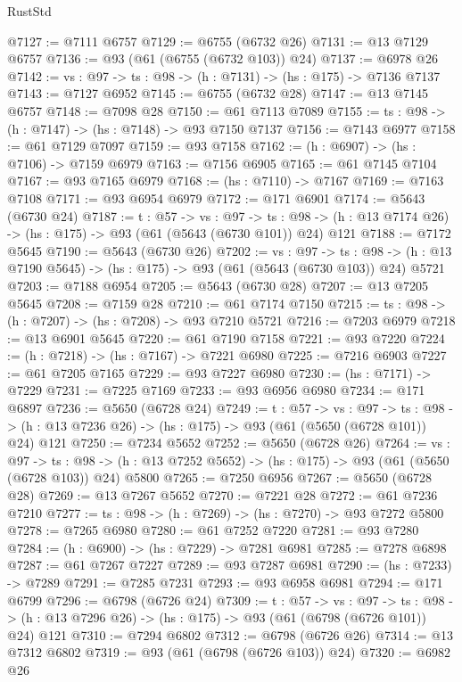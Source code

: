 \begin{lexlean}{RustStd}
\begin{coremodule}
@7127 := @7111 @6757
@7129 := @6755 (@6732 @26)
@7131 := @13 @7129 @6757
@7136 := @93 (@61 (@6755 (@6732 @103)) @24)
@7137 := @6978 @26
@7142 := {vs : @97} -> {ts : @98} -> (h : @7131) -> (hs : @175) -> @7136 @7137
@7143 := @7127 @6952
@7145 := @6755 (@6732 @28)
@7147 := @13 @7145 @6757
@7148 := @7098 @28
@7150 := @61 @7113 @7089
@7155 := {ts : @98} -> (h : @7147) -> (hs : @7148) -> @93 @7150 @7137
@7156 := @7143 @6977
@7158 := @61 @7129 @7097
@7159 := @93 @7158
@7162 := (h : @6907) -> (hs : @7106) -> @7159 @6979
@7163 := @7156 @6905
@7165 := @61 @7145 @7104
@7167 := @93 @7165 @6979
@7168 := (hs : @7110) -> @7167
@7169 := @7163 @7108
@7171 := @93 @6954 @6979
@7172 := @171 @6901
@7174 := @5643 (@6730 @24)
@7187 := {t : @57} ->
  {vs : @97} ->
  {ts : @98} -> (h : @13 @7174 @26) -> (hs : @175) -> @93 (@61 (@5643 (@6730 @101)) @24) @121
@7188 := @7172 @5645
@7190 := @5643 (@6730 @26)
@7202 := {vs : @97} ->
  {ts : @98} -> (h : @13 @7190 @5645) -> (hs : @175) -> @93 (@61 (@5643 (@6730 @103)) @24) @5721
@7203 := @7188 @6954
@7205 := @5643 (@6730 @28)
@7207 := @13 @7205 @5645
@7208 := @7159 @28
@7210 := @61 @7174 @7150
@7215 := {ts : @98} -> (h : @7207) -> (hs : @7208) -> @93 @7210 @5721
@7216 := @7203 @6979
@7218 := @13 @6901 @5645
@7220 := @61 @7190 @7158
@7221 := @93 @7220
@7224 := (h : @7218) -> (hs : @7167) -> @7221 @6980
@7225 := @7216 @6903
@7227 := @61 @7205 @7165
@7229 := @93 @7227 @6980
@7230 := (hs : @7171) -> @7229
@7231 := @7225 @7169
@7233 := @93 @6956 @6980
@7234 := @171 @6897
@7236 := @5650 (@6728 @24)
@7249 := {t : @57} ->
  {vs : @97} ->
  {ts : @98} -> (h : @13 @7236 @26) -> (hs : @175) -> @93 (@61 (@5650 (@6728 @101)) @24) @121
@7250 := @7234 @5652
@7252 := @5650 (@6728 @26)
@7264 := {vs : @97} ->
  {ts : @98} -> (h : @13 @7252 @5652) -> (hs : @175) -> @93 (@61 (@5650 (@6728 @103)) @24) @5800
@7265 := @7250 @6956
@7267 := @5650 (@6728 @28)
@7269 := @13 @7267 @5652
@7270 := @7221 @28
@7272 := @61 @7236 @7210
@7277 := {ts : @98} -> (h : @7269) -> (hs : @7270) -> @93 @7272 @5800
@7278 := @7265 @6980
@7280 := @61 @7252 @7220
@7281 := @93 @7280
@7284 := (h : @6900) -> (hs : @7229) -> @7281 @6981
@7285 := @7278 @6898
@7287 := @61 @7267 @7227
@7289 := @93 @7287 @6981
@7290 := (hs : @7233) -> @7289
@7291 := @7285 @7231
@7293 := @93 @6958 @6981
@7294 := @171 @6799
@7296 := @6798 (@6726 @24)
@7309 := {t : @57} ->
  {vs : @97} ->
  {ts : @98} -> (h : @13 @7296 @26) -> (hs : @175) -> @93 (@61 (@6798 (@6726 @101)) @24) @121
@7310 := @7294 @6802
@7312 := @6798 (@6726 @26)
@7314 := @13 @7312 @6802
@7319 := @93 (@61 (@6798 (@6726 @103)) @24)
@7320 := @6982 @26

\end{coremodule}
\end{lexlean}
